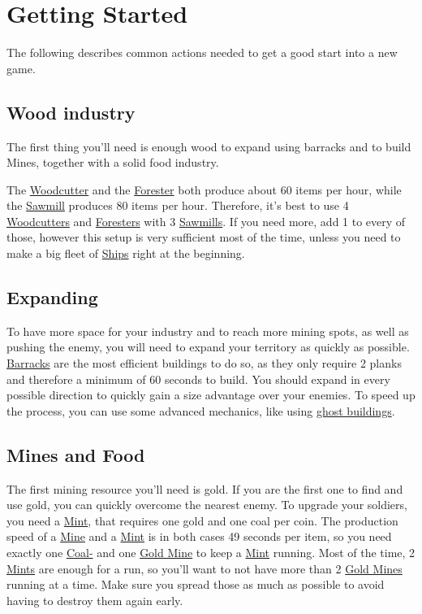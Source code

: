 \documentclass[12pt]{article}
\begin{document}
\section{Getting Started}
\label{sec:gettingstarted}

The following describes common actions needed to get a good start into a new game.

\subsection{Wood industry}
\label{sec:woodindustry}

The first thing you'll need is enough wood to expand using barracks and to build Mines, together with a solid food industry.

The \hyperref[sec:woodcutter]{Woodcutter} and the \hyperref[sec:forester]{Forester} both produce about 60 items per hour, while the \hyperref[sec:sawmill]{Sawmill} produces 80 items per hour. Therefore, it's best to use 4 \hyperref[sec:woodcutter]{Woodcutters} and \hyperref[sec:forester]{Foresters} with 3 \hyperref[sec:sawmill]{Sawmills}. If you need more, add 1 to every of those, however this setup is very sufficient most of the time, unless you need to make a big fleet of \hyperref[sec:ships]{Ships} right at the beginning.

\subsection{Expanding}
\label{sec:expanding}

To have more space for your industry and to reach more mining spots, as well as pushing the enemy, you will need to expand your territory as quickly as possible. \hyperref[sec:barrack]{Barracks} are the most efficient buildings to do so, as they only require 2 planks and therefore a minimum of 60 seconds to build. You should expand in every possible direction to quickly gain a size advantage over your enemies. To speed up the process, you can use some advanced mechanics, like using \hyperref[sec:ghostbuildings]{ghost buildings}.

\subsection{Mines and Food}
\label{sec:minesandfoot}

The first mining resource you'll need is gold. If you are the first one to find and use gold, you can quickly overcome the nearest enemy. To upgrade your soldiers, you need a \hyperref[sec:mint]{Mint}, that requires one gold and one coal per coin. The production speed of a \hyperref[sec:mine]{Mine} and a \hyperref[sec:mint]{Mint} is in both cases 49 seconds per item, so you need exactly one \hyperref[sec:coalmine]{Coal-} and one \hyperref[sec:goldmine]{Gold Mine} to keep a \hyperref[sec:mint]{Mint} running. Most of the time, 2 \hyperref[sec:mint]{Mints} are enough for a run, so you'll want to not have more than 2 \hyperref[sec:goldmine]{Gold Mines} running at a time. Make sure you spread those as much as possible to avoid having to destroy them again early.
\end{document}
